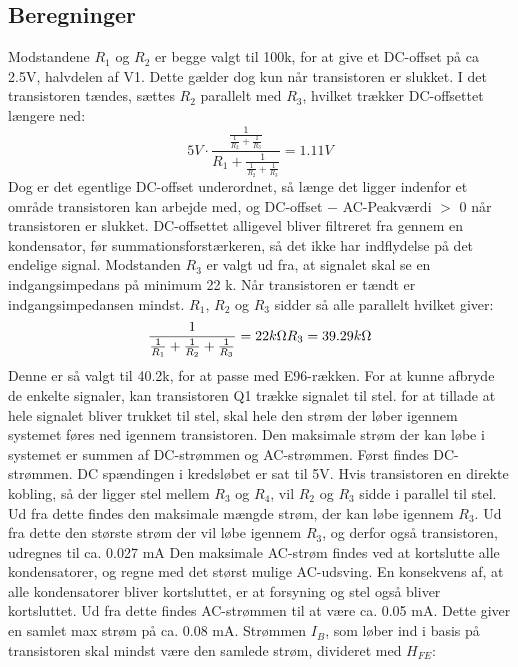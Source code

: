 \subsection*{Beregninger}

Modstandene $R_1$ og $R_2$ er begge valgt til 100k\ohm, for at give et DC-offset på ca 2.5V, halvdelen af V1. Dette gælder dog kun når transistoren er slukket. I det transistoren tændes, sættes $R_2$ parallelt med $R_3$, hvilket trækker DC-offsettet længere ned:
\begin{equation}
5V\cdot \frac{\frac{1}{\frac{1}{R_2}+\frac{1}{R_3}}}{R_1+\frac{1}{\frac{1}{R_2}+\frac{1}{R_3}}}=1.11 V
\end{equation}
Dog er det egentlige DC-offset underordnet, så længe det ligger indenfor et område transistoren kan arbejde med, og DC-offset $-$ AC-Peakværdi $>$ 0 når transistoren er slukket. DC-offsettet alligevel bliver filtreret fra gennem en kondensator, før summationsforstærkeren, så det ikke har indflydelse på det endelige signal.
Modstanden $R_3$ er valgt ud fra, at signalet skal se en indgangsimpedans på minimum 22 k\ohm. Når transistoren er tændt er indgangsimpedansen mindst. $R_1$, $R_2$ og $R_3$ sidder så alle parallelt hvilket giver:
\begin{equation}
\frac{1}{\frac{1}{R_1}+\frac{1}{R_2}+\frac{1}{R_3}}=22 k\ohm
\\
R_3=39.29 k\ohm
\end{equation}
Denne er så valgt til 40.2k\ohm, for at passe med E96-rækken.
For at kunne afbryde de enkelte signaler, kan transistoren Q1 trække signalet til stel. for at tillade at hele signalet bliver trukket til stel, skal hele den strøm der løber igennem systemet føres ned igennem transistoren. Den maksimale strøm der kan løbe i systemet er summen af DC-strømmen og AC-strømmen. 
Først findes DC-strømmen. DC spændingen i kredsløbet er sat til 5V. Hvis transistoren en direkte kobling, så der ligger stel mellem $R_3$ og $R_4$, vil $R_2$ og $R_3$ sidde i parallel til stel. Ud fra dette findes den maksimale mængde strøm, der kan løbe igennem $R_3$. Ud fra dette den største strøm der vil løbe igennem $R_3$, og derfor også transistoren, udregnes til ca. 0.027 mA
Den maksimale AC-strøm findes ved at kortslutte alle kondensatorer, og regne med det størst mulige AC-udsving. En konsekvens af, at alle kondensatorer bliver kortsluttet, er at forsyning og stel også bliver kortsluttet. Ud fra dette findes AC-strømmen til at være ca. 0.05 mA. Dette giver en samlet max strøm på ca. 0.08 mA.
Strømmen $I_B$, som løber ind i basis på transistoren skal mindst være den samlede strøm, divideret med $H_{FE}$:
